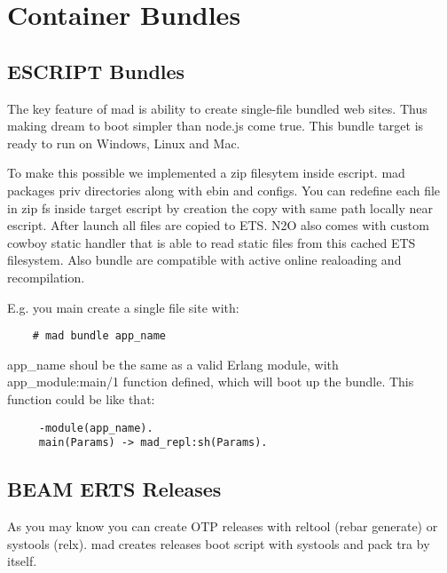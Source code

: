 \section{Container Bundles}

\subsection{ESCRIPT Bundles}

The key feature of mad is ability to create single-file bundled web sites.
Thus making dream to boot simpler than node.js come true.
This bundle target is ready to run on Windows, Linux and Mac.

To make this possible we implemented a zip filesytem inside escript.
mad packages priv directories along with ebin and configs.
You can redefine each file in zip fs inside target
escript by creation the copy with same path locally near escript.
After launch all files are copied to ETS.
N2O also comes with custom cowboy static handler that is able to
read static files from this cached ETS filesystem.
Also bundle are compatible with active online realoading and recompilation.

E.g. you main create a single file site with:

\vspace{1\baselineskip}
\begin{lstlisting}
    # mad bundle app_name
\end{lstlisting}
\vspace{1\baselineskip}

app\_name shoul be the same as a valid Erlang module, with app\_module:main/1
function defined, which will boot up the bundle. This function could be like that:

\vspace{1\baselineskip}
\begin{lstlisting}
     -module(app_name).
     main(Params) -> mad_repl:sh(Params).
\end{lstlisting}
\vspace{1\baselineskip}

\subsection{BEAM ERTS Releases}

As you may know you can create OTP releases with
reltool (rebar generate) or systools (relx). mad creates releases boot
script with systools and pack tra by itself.

